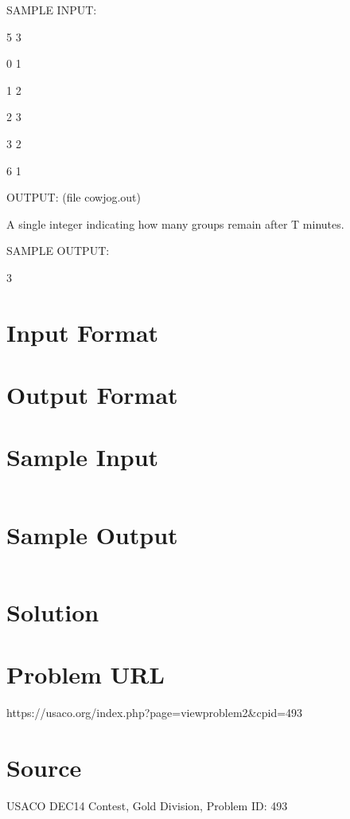 \documentclass[12pt]{article}
\begin{document}
SAMPLE INPUT:



5 3

0 1

1 2

2 3

3 2

6 1



OUTPUT: (file cowjog.out)



A single integer indicating how many groups remain after T minutes.



SAMPLE OUTPUT:



3






\section*{Input Format}


\section*{Output Format}


\section*{Sample Input}
\begin{verbatim}

\end{verbatim}

\section*{Sample Output}
\begin{verbatim}

\end{verbatim}

\section*{Solution}


\section*{Problem URL}
https://usaco.org/index.php?page=viewproblem2&cpid=493

\section*{Source}
USACO DEC14 Contest, Gold Division, Problem ID: 493
\end{document}
